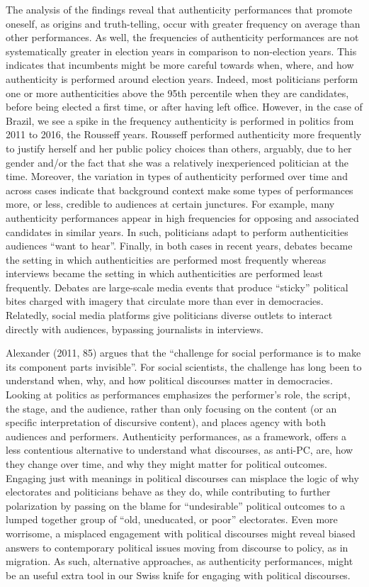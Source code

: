\documentclass[
  12pt,
]{article}
\begin{document}
The analysis of the findings reveal that authenticity performances that
promote oneself, as origins and truth-telling, occur with greater
frequency on average than other performances. As well, the frequencies
of authenticity performances are not systematically greater in election
years in comparison to non-election years. This indicates that
incumbents might be more careful towards when, where, and how
authenticity is performed around election years. Indeed, most
politicians perform one or more authenticities above the 95th percentile
when they are candidates, before being elected a first time, or after
having left office. However, in the case of Brazil, we see a spike in
the frequency authenticity is performed in politics from 2011 to 2016,
the Rousseff years. Rousseff performed authenticity more frequently to
justify herself and her public policy choices than others, arguably, due
to her gender and/or the fact that she was a relatively inexperienced
politician at the time. Moreover, the variation in types of authenticity
performed over time and across cases indicate that background context
make some types of performances more, or less, credible to audiences at
certain junctures. For example, many authenticity performances appear in
high frequencies for opposing and associated candidates in similar
years. In such, politicians adapt to perform authenticities audiences
``want to hear''. Finally, in both cases in recent years, debates became
the setting in which authenticities are performed most frequently
whereas interviews became the setting in which authenticities are
performed least frequently. Debates are large-scale media events that
produce ``sticky'' political bites charged with imagery that circulate
more than ever in democracies. Relatedly, social media platforms give
politicians diverse outlets to interact directly with audiences,
bypassing journalists in interviews.

Alexander (2011, 85) argues that the ``challenge for social performance
is to make its component parts invisible''. For social scientists, the
challenge has long been to understand when, why, and how political
discourses matter in democracies. Looking at politics as performances
emphasizes the performer's role, the script, the stage, and the
audience, rather than only focusing on the content (or an specific
interpretation of discursive content), and places agency with both
audiences and performers. Authenticity performances, as a framework,
offers a less contentious alternative to understand what discourses, as
anti-PC, are, how they change over time, and why they might matter for
political outcomes. Engaging just with meanings in political discourses
can misplace the logic of why electorates and politicians behave as they
do, while contributing to further polarization by passing on the blame
for ``undesirable'' political outcomes to a lumped together group of
``old, uneducated, or poor'' electorates. Even more worrisome, a
misplaced engagement with political discourses might reveal biased
answers to contemporary political issues moving from discourse to
policy, as in migration. As such, alternative approaches, as
authenticity performances, might be an useful extra tool in our Swiss
knife for engaging with political discourses.
\end{document}
